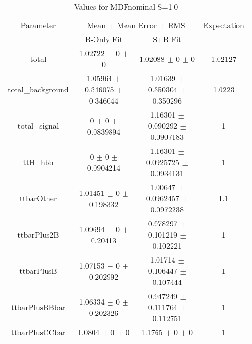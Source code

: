 \begin{table}
\centering
\caption{Values for MDFnominal S=1.0}
\begin{tabular}{cccc}
\toprule
Parameter & \multicolumn{2}{c}{Mean $\pm$ Mean Error $\pm$ RMS} & Expectation\\
 & B-Only Fit & S+B Fit & \\
\midrule
total & \num{1.02722} $\pm$ \num{0} $\pm$ \num{0} & \num{1.02088} $\pm$ \num{0} $\pm$ \num{0} & \num{1.02127}\\
total\_background & \num{1.05964} $\pm$ \num{0.346075} $\pm$ \num{0.346044} & \num{1.01639} $\pm$ \num{0.350304} $\pm$ \num{0.350296} & \num{1.0223}\\
total\_signal & \num{0} $\pm$ \num{0} $\pm$ \num{0.0839894} & \num{1.16301} $\pm$ \num{0.090292} $\pm$ \num{0.0907183} & \num{1}\\
ttH\_hbb & \num{0} $\pm$ \num{0} $\pm$ \num{0.0904214} & \num{1.16301} $\pm$ \num{0.0925725} $\pm$ \num{0.0934131} & \num{1}\\
ttbarOther & \num{1.01451} $\pm$ \num{0} $\pm$ \num{0.198332} & \num{1.00647} $\pm$ \num{0.0962457} $\pm$ \num{0.0972238} & \num{1.1}\\
ttbarPlus2B & \num{1.09694} $\pm$ \num{0} $\pm$ \num{0.20413} & \num{0.978297} $\pm$ \num{0.101219} $\pm$ \num{0.102221} & \num{1}\\
ttbarPlusB & \num{1.07153} $\pm$ \num{0} $\pm$ \num{0.202992} & \num{1.01714} $\pm$ \num{0.106447} $\pm$ \num{0.107444} & \num{1}\\
ttbarPlusBBbar & \num{1.06334} $\pm$ \num{0} $\pm$ \num{0.202326} & \num{0.947249} $\pm$ \num{0.111764} $\pm$ \num{0.112751} & \num{1}\\
ttbarPlusCCbar & \num{1.0804} $\pm$ \num{0} $\pm$ \num{0} & \num{1.1765} $\pm$ \num{0} $\pm$ \num{0} & \num{1}\\
\bottomrule
\end{tabular}
\end{table}